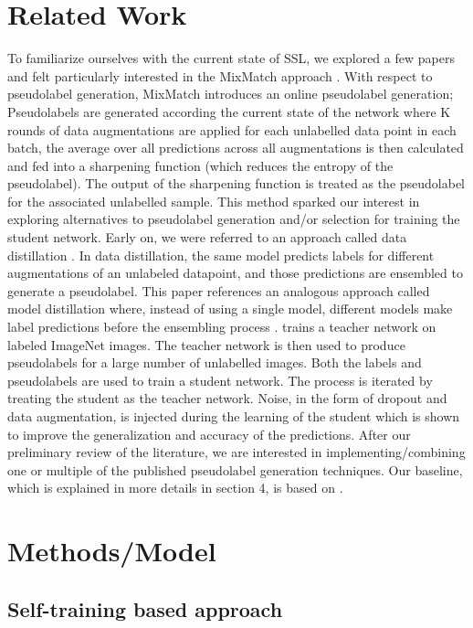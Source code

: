 \documentclass{article}
\begin{document}
\section{Related Work}
To familiarize ourselves with the current state of SSL, we explored a few papers and felt particularly interested in the MixMatch approach \cite{Berthelot2019MixMatch:Learning}. With respect to pseudolabel generation, MixMatch introduces an online pseudolabel generation; Pseudolabels are generated according the current state of the network where K rounds of  data augmentations are applied for each unlabelled data point in each batch, the average over all predictions across all augmentations is then calculated and fed into a sharpening function (which reduces the entropy of the pseudolabel). The output of the sharpening function is treated as the pseudolabel for the associated unlabelled sample. This method sparked our interest in exploring alternatives to pseudolabel generation and/or selection for training the student network. Early on, we were referred to an approach called data distillation \cite{Radosavovic_2018_CVPR}. In data distillation, the same model predicts labels for different augmentations of an unlabeled datapoint, and those predictions are ensembled to generate a pseudolabel. This paper references an analogous approach called model distillation where, instead of using a single model, different models make label predictions before the ensembling process \cite{hinton2015distilling}. \cite{xie2019selftraining} trains a teacher network on labeled ImageNet images. The teacher network is then used to produce pseudolabels for a large number of unlabelled images. Both the labels and pseudolabels are used to train a student network. The process is iterated by treating the student as the teacher network. Noise, in the form of dropout and data augmentation, is injected during the learning of the student which is shown to improve the generalization and accuracy of the predictions.
After our preliminary review of the literature, we are interested in implementing/combining one or multiple of the published pseudolabel generation techniques. Our baseline, which is explained in more details in section 4, is based on \cite{xie2019selftraining}. 
\section{Methods/Model}
\subsection{Self-training based approach}
\end{document}
